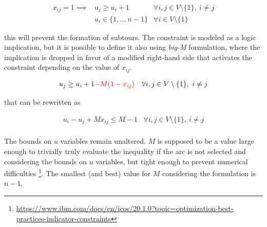 \begin{equation*} 
    \begin{array}{llr} 
        x_{ij} = 1 \implies & u_j \geq u_i + 1 & \forall i, j \in V \setminus \{1\},\ i \neq j \\
                            & u_i \in \{1, \dots\ n-1\} & \forall i \in V \setminus \{1\}
    \end{array} 
\end{equation*}

this will prevent the formation of subtours. 
The constraint is modeled as a
logic implication, but it is possible to define it also using \emph{big-M}
formulation, where the implication is dropped in favor of a modified right-hand
side that activates the constraint depending on the value of $x_{ij}$.

\begin{equation*} 
    \begin{array}{lr} 
        u_j \geq u_i + 1 \textcolor{red}{ - M (1 - x_{ij})} & \forall i, j \in V \setminus \{1\},\ i \neq j \\
    \end{array} 
\end{equation*}

that can be rewritten as

\begin{equation*} 
    \begin{array}{lr} 
        u_i - u_j + M x_{ij} \leq M - 1 & \forall i, j \in V \setminus \{1\},\ i \neq j \\
    \end{array} 
\end{equation*}

The bounds on $u$ variables remain unaltered. $M$ is supposed to be a
value large enough to trivially truly evaluate the inequality if the arc is not
selected and considering the bounds on $u$ variables, but tight enough to
prevent numerical difficulties
\footnote{\href{https://www.ibm.com/docs/en/icos/20.1.0?topic=optimization-best-practices-indicator-constraints}{https://www.ibm.com/docs/en/icos/20.1.0?topic=optimization-best-practices-indicator-constraints}}.
The smallest (and best) value for $M$ considering the formulation is $n - 1$.

